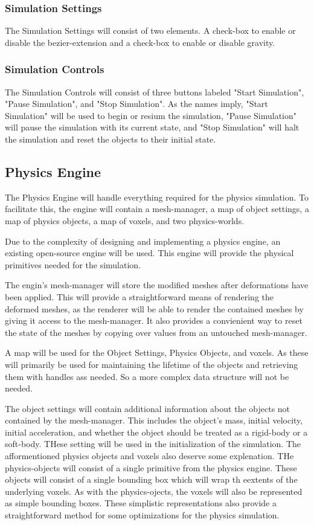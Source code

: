 \subsubsection{Simulation Settings}

The Simulation Settings will consist of two elements. A check-box to enable or disable the bezier-extension and a 
check-box to enable or disable gravity.

\subsubsection{Simulation Controls}

The Simulation Controls will consist of three buttons labeled "Start Simulation", "Pause Simulation", and 
"Stop Simulation". As the names imply, "Start Simulation" will be used to begin or resium the simulation, "Pause 
Simulation" will pause the simulation with its current state, and "Stop Simulation" will halt the simulation and 
reset the objects to their initial state.

\subsection{Physics Engine}

The Physics Engine will handle everything required for the physics simulation. To facilitate this, the engine will 
contain a mesh-manager, a map of object settings, a map of physics objects, a map of voxels, and two physics-worlds.

Due to the complexity of designing and implementing a physics engine, an existing open-source engine will be used.
This engine will provide the physical primitives needed for the simulation.

The engin's mesh-manager will store the modified meshes after deformations have been applied. This will provide a
straightforward means of rendering the deformed meshes, as the renderer will be able to render the contained 
meshes by giving it access to the mesh-manager. It also provides a convienient way to reset the state of the meshes by
copying over values from an untouched mesh-manager.

A map will be used for the Object Settings, Physics Objects, and voxels. As these will primarily be used for 
maintaining the lifetime of the objects and retrieving them with handles ass needed. So a more complex data structure 
will not be needed.

The object settings will contain additional information about the objects not contained by the mesh-manager. This 
includes the object's mass, initial velocity, initial acceleration, and whether the object should be treated as a 
rigid-body or a soft-body. THese setting will be used in the initialization of the simulation. The afformentioned
physics objects and voxels also deserve some explenation. THe physics-objects will consist of a single primitive
from the physics engine. These objects will consist of a single bounding box which will wrap th eextents of the
underlying voxels. As with the physics-ojects, the voxels will also be represented as simple bounding boxes. These
simplistic representations also provide a straightforward method for some optimizations for the physics simulation.


